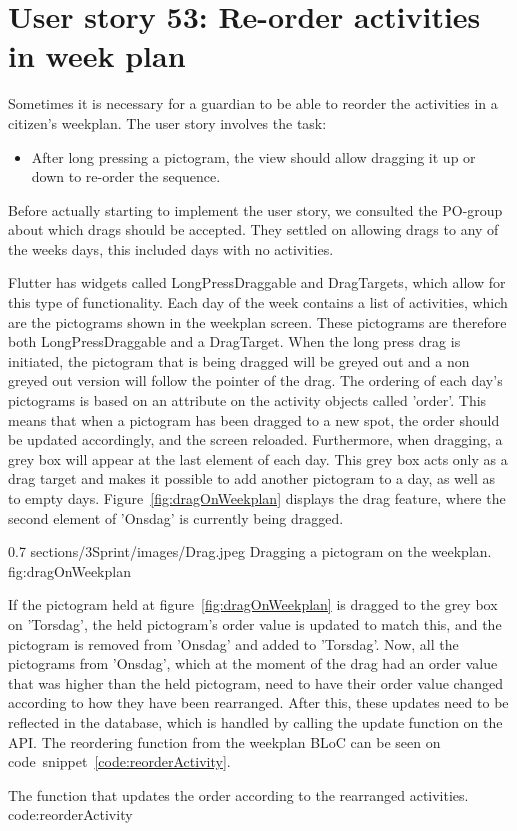 \section{User story 53: Re-order activities in week plan}
Sometimes it is necessary for a guardian to be able to reorder the activities in a citizen's weekplan. The user story involves the task:
\begin{itemize}
    \item After long pressing a pictogram, the view should allow dragging it up or down to re-order the sequence.
\end{itemize}
Before actually starting to implement the user story, we consulted the PO-group about which drags should be accepted. They settled on allowing drags to any of the weeks days, this included days with no activities.

Flutter has widgets called LongPressDraggable and DragTargets, which allow for this type of functionality.
Each day of the week contains a list of activities, which are the pictograms shown in the weekplan screen. These pictograms are therefore both LongPressDraggable and a DragTarget.
When the long press drag is initiated, the pictogram that is being dragged will be greyed out and a non greyed out version will follow the pointer of the drag. The ordering of each day's pictograms is based on an attribute on the activity objects called 'order'. This means that when a pictogram has been dragged to a new spot, the order should be updated accordingly, and the screen reloaded. Furthermore, when dragging, a grey box will appear at the last element of each day. This grey box acts only as a drag target and makes it possible to add another pictogram to a day, as well as to empty days.
Figure~\ref{fig:dragOnWeekplan} displays the drag feature, where the second element of 'Onsdag' is currently being dragged.


        {0.7} %
        {sections/3Sprint/images/Drag.jpeg} %
        {Dragging a pictogram on the weekplan.} %
        {fig:dragOnWeekplan} %

If the pictogram held at figure~\ref{fig:dragOnWeekplan} is dragged to the grey box on 'Torsdag', the held pictogram's order value is updated to match this, and the pictogram is removed from 'Onsdag' and added to 'Torsdag'. Now, all the pictograms from 'Onsdag', which at the moment of the drag had an order value that was higher than the held pictogram, need to have their order value changed according to how they have been rearranged.
After this, these updates need to be reflected in the database, which is handled by calling the update function on the API.
The reordering function from the weekplan BLoC can be seen on code~snippet~\ref{code:reorderActivity}.

        {The function that updates the order according to the rearranged activities.} %
        {code:reorderActivity} %